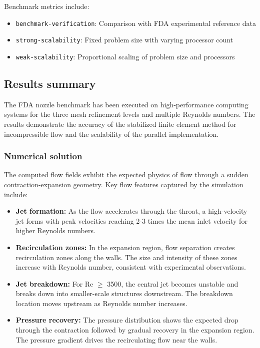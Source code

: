 Benchmark metrics include:
\begin{itemize}
    \item \texttt{benchmark-verification}: Comparison with FDA experimental reference data
    \item \texttt{strong-scalability}: Fixed problem size with varying processor count
    \item \texttt{weak-scalability}: Proportional scaling of problem size and processors
\end{itemize}





\subsection{Results summary}

The FDA nozzle benchmark has been executed on high-performance computing systems for the three mesh refinement levels and multiple Reynolds numbers. The results demonstrate the accuracy of the stabilized finite element method for incompressible flow and the scalability of the parallel implementation.

\subsubsection{Numerical solution}

The computed flow fields exhibit the expected physics of flow through a sudden contraction-expansion geometry. Key flow features captured by the simulation include:

\begin{itemize}
\item \textbf{Jet formation:} As the flow accelerates through the throat, a high-velocity jet forms with peak velocities reaching 2-3 times the mean inlet velocity for higher Reynolds numbers.

\item \textbf{Recirculation zones:} In the expansion region, flow separation creates recirculation zones along the walls. The size and intensity of these zones increase with Reynolds number, consistent with experimental observations.

\item \textbf{Jet breakdown:} For Re $\geq$ 3500, the central jet becomes unstable and breaks down into smaller-scale structures downstream. The breakdown location moves upstream as Reynolds number increases.

\item \textbf{Pressure recovery:} The pressure distribution shows the expected drop through the contraction followed by gradual recovery in the expansion region. The pressure gradient drives the recirculating flow near the walls.
\end{itemize}

